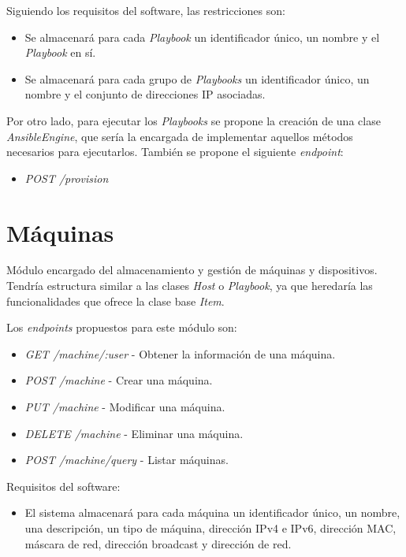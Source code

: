 \bigskip
Siguiendo los requisitos del software, las restricciones son:
\begin{itemize}
	\item Se almacenará para cada \textit{Playbook} un identificador único, un nombre y el \textit{Playbook} en sí.
	\item Se almacenará para cada grupo de \textit{Playbooks} un identificador único, un nombre y el conjunto de direcciones IP asociadas.
\end{itemize}

\bigskip
Por otro lado, para ejecutar los \textit{Playbooks} se propone la creación de una clase \textit{AnsibleEngine}, que sería la encargada de implementar aquellos métodos necesarios para ejecutarlos. También se propone el siguiente \textit{endpoint}:
\begin{itemize}
	\item \textit{POST /provision}
\end{itemize}




\section{Máquinas}
\label{sec:machinescap6}

Módulo encargado del almacenamiento y gestión de máquinas y dispositivos. Tendría estructura similar a las clases \textit{Host} o \textit{Playbook}, ya que heredaría las funcionalidades que ofrece la clase base \textit{Item}.

\bigskip
Los \textit{endpoints} propuestos para este módulo son:
\begin{itemize}
	\item \textit{GET /machine/:user} - Obtener la información de una máquina.
	\item \textit{POST /machine} - Crear una máquina.
	\item \textit{PUT /machine} - Modificar una máquina.
	\item \textit{DELETE /machine} - Eliminar una máquina.
	\item \textit{POST /machine/query} - Listar máquinas.
\end{itemize}



\bigskip
Requisitos del software:
\begin{itemize}
	\item El sistema almacenará para cada máquina un identificador único, un nombre, una descripción, un tipo de máquina, dirección IPv4 e IPv6, dirección MAC, máscara de red, dirección broadcast y dirección de red.
\end{itemize}


